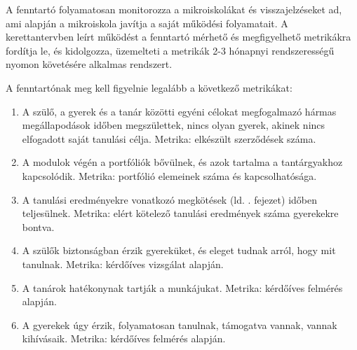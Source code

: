 A fenntartó folyamatosan monitorozza a mikroiskolákat és visszajelzéseket ad,
ami alapján a mikroiskola javítja a saját működési folyamatait. A kerettantervben leírt működést a
fenntartó mérhető és megfigyelhető metrikákra fordítja le, és kidolgozza,
üzemelteti a metrikák 2-3 hónapnyi rendszerességű nyomon követésére alkalmas
rendszert.

A fenntartónak meg kell figyelnie legalább a következő metrikákat:
\begin{enumerate}
      \item A szülő, a gyerek és a tanár közötti egyéni célokat megfogalmazó
            hármas
            megállapodások időben megszülettek, nincs olyan gyerek, akinek
            nincs
            elfogadott
            saját tanulási célja. Metrika: elkészült szerződések száma.

      \item A modulok végén a portfóliók bővülnek, és azok tartalma a
            tantárgyakhoz
            kapcsolódik. Metrika: portfólió elemeinek száma és kapcsolhatósága.
      \item A tanulási eredményekre vonatkozó megkötések
            (ld. . fejezet) időben teljesülnek.
            Metrika: elért kötelező tanulási eredmények száma gyerekekre
            bontva.

      \item A szülők biztonságban érzik gyereküket, és eleget tudnak arról,
            hogy
            mit
            tanulnak. Metrika: kérdőíves vizsgálat alapján.

      \item A tanárok hatékonynak tartják a munkájukat. Metrika: kérdőíves felmérés
            alapján.

      \item A gyerekek úgy érzik, folyamatosan tanulnak, támogatva vannak,
            vannak
            kihívásaik. Metrika: kérdőíves felmérés alapján.
\end{enumerate}
